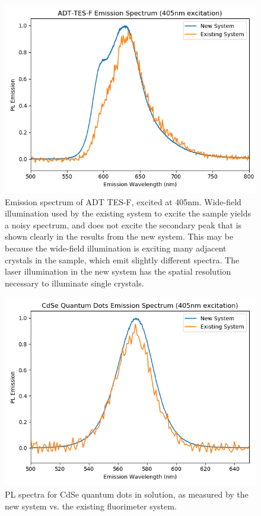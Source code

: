 \begin{figure}[h]
    \centering
    \includegraphics[width=\textwidth]{./img/tesf-2.png}%
    \caption{Emission spectrum of ADT TES-F, excited at 405nm.
    Wide-field illumination used by the existing system to excite the sample
    yields a noisy spectrum, and does not excite the secondary peak that is 
    shown clearly in the results from the new system. This may be because the
    wide-field illumination is exciting many adjacent crystals in the sample, 
    which emit slightly different spectra. The laser illumination in the new 
    system has the spatial resolution necessary to illuminate single crystals.}
    \label{fig:pl-adt-tesf}
\end{figure}

\begin{figure}[h]
    \centering
    \includegraphics[width=\textwidth]{./img/qd-2.png}
    \caption{PL spectra for CdSe quantum dots in solution, as measured by the new system vs. the existing fluorimeter system.}
    \label{fig:pl-adt-qd}
\end{figure}